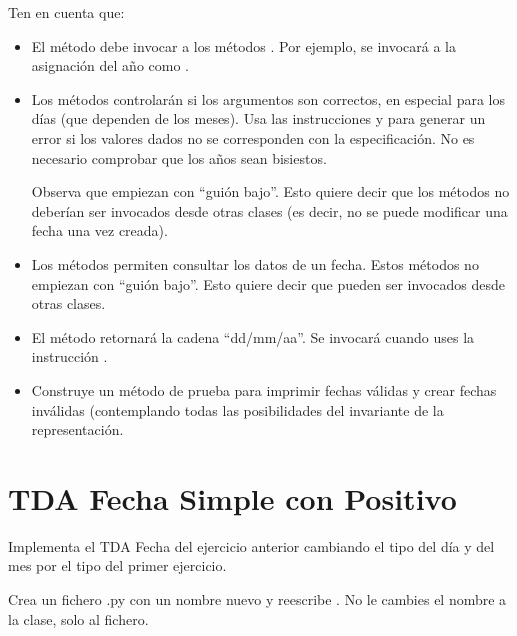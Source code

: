 Ten en cuenta que:
\begin{itemize}
\item El método  debe invocar a los métodos . Por ejemplo, se invocará a la asignación del año como .

\item Los métodos  controlarán si los argumentos son correctos, en especial para los días (que dependen de los meses).
Usa las instrucciones  y  para generar un error si los valores dados no se corresponden con la especificación. 
No es necesario comprobar que los años sean bisiestos.

Observa que empiezan con ``guión bajo''. Esto quiere decir que los métodos  no deberían ser invocados desde otras clases (es decir, no se puede modificar una fecha una vez creada). 

\item Los métodos  permiten consultar los datos de un fecha.
Estos métodos no empiezan con ``guión bajo''. Esto quiere decir que pueden ser invocados desde otras clases. 

\item El método  retornará la cadena ``dd/mm/aa''.
Se invocará cuando uses la instrucción .

\item Construye un método de prueba para imprimir fechas válidas y crear fechas inválidas (contemplando todas las posibilidades del invariante de la representación.
\end{itemize}





 
\separacion
\section{TDA Fecha Simple con Positivo} \label{sec:FechaSimplePositivos}

Implementa el TDA Fecha del ejercicio anterior cambiando el tipo  del día y del mes por el tipo  del primer ejercicio.

Crea un fichero .py con un nombre nuevo y reescribe . No le cambies el nombre a la clase, solo al fichero.


